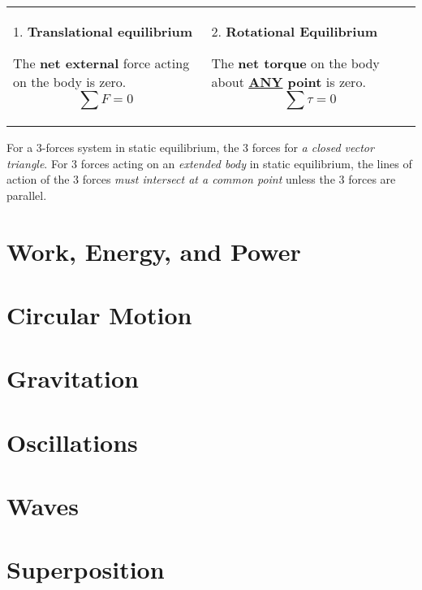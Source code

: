 \documentclass[a4paper]{article}
\begin{document}
			\begin{tabular}{@{} C{0.5\textwidth} C{0.5\textwidth}  @{}}
				1. \textbf{Translational equilibrium} \par The \textbf{net external} force acting on the body is zero. $$\sum F = 0$$ & 2. \textbf{Rotational Equilibrium} \par The \textbf{net torque} on the body about \textbf{\underline{ANY} point} is zero. $$\sum \tau = 0$$ \vspace*{-\baselineskip} \\
			\end{tabular}
			
			For a 3-forces system in static equilibrium, the 3 forces for \textit{a closed vector triangle}. For 3 forces acting on an \textit{extended body} in static equilibrium, the lines of action of the 3 forces \textit{must intersect at a common point} unless the 3 forces are parallel.
	\section{Work, Energy, and Power}
	\section{Circular Motion}
	\section{Gravitation}
	\section{Oscillations}
	\section{Waves}
	\section{Superposition}
\end{document}
